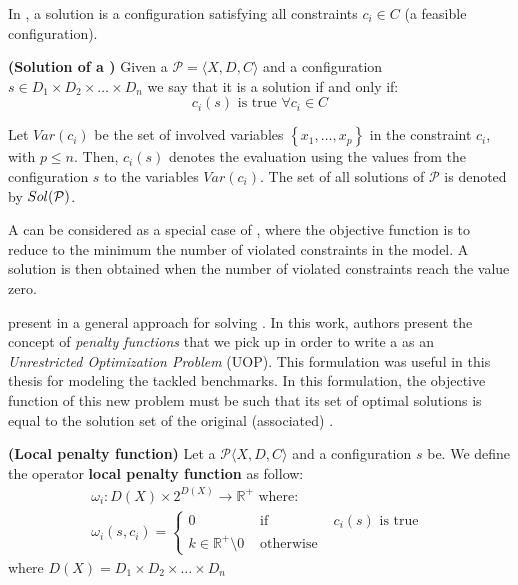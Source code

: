 In \csps, a solution is a configuration satisfying all constraints $c_i \in C$ (a feasible configuration). %

\begin{definition}{\bf (Solution of a \csp)}
\label{solCSP}
Given a \csp{} $\mathcal{P}=\langle X,D,C \rangle$ and a configuration $s \in D_1\times D_2\times\dots\times D_n$ we say that it is a solution if and only if:	
\begin{equation*}
c_i\left(s\right)\text{ is true }\forall c_i \in C
\end{equation*}
\end{definition}

Let $Var(c_i)$ be the set of involved variables $\left\{x_1, \dots, x_p\right\}$ in the constraint $c_i$, with $p\leq n$. Then, $c_i\left(s\right)$ denotes the evaluation using the values from the configuration $s$ to the variables $Var(c_i)$. The set of all solutions of $\mathcal{P}$ is denoted by $\mathnormal{Sol}(\mathcal{P})$.

A \csp{} can be considered as a special case of \cops, where the objective function is to reduce to the minimum the number of violated constraints in the model. A solution is then obtained when the number of violated constraints reach the value zero. 

 present in \cite{Galinier04} a general approach for solving \csps{}. In this work, authors present the concept of {\it penalty functions} that we pick up in order to write a \csp{} as an \textit{Unrestricted Optimization Problem} (UOP). This formulation was useful in this thesis for modeling the tackled benchmarks. In this formulation, the objective function of this new problem must be such that its set of optimal solutions is equal to the solution set of the original (associated) \csp.

\begin{definition}{\bf (Local penalty function)}
\label{def:local_cost}
Let a {\bf \csp} $\mathcal{P}\langle X,D,C \rangle$ and a configuration $s$ be. We define the operator {\bf local penalty function} as follow: 
\begin{equation*}
\begin{array}{l}
	\omega_i:D\left(X\right)\times 2^{D\left(X\right)}\rightarrow\mathbb{R}^+\text{ where: }\\
	\omega_i\left(s,c_i\right)=\left\{
	\begin{array}{lll}
	0 & \text{ if } & c_i(s)\text{ is true }\\
	k \in \mathbb{R}^+ \setminus {0} & \text{ otherwise } &
	\end{array}
	\right.
\end{array}
\end{equation*}
where $D\left(X\right) = D_1\times D_2 \times\dots\times D_n$
\end{definition}

